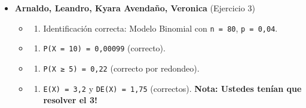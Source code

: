 \documentclass[
  spanish,
  letterpaper,
  DIV=11,
  numbers=noendperiod]{scrreprt}
\providecommand{\tightlist}{%
  \setlength{\itemsep}{0pt}\setlength{\parskip}{0pt}}
\begin{document}
\begin{itemize}
\tightlist
\item
  \textbf{Arnaldo, Leandro, Kyara Avendaño, Veronica} (Ejercicio 3)

  \begin{itemize}
  \tightlist
  \item
    \begin{enumerate}
    \def\labelenumi{\alph{enumi})}
    \tightlist
    \item
      Identificación correcta: Modelo Binomial con \texttt{n\ =\ 80},
      \texttt{p\ =\ 0,04}.
    \end{enumerate}
  \item
    \begin{enumerate}
    \def\labelenumi{\alph{enumi})}
    \setcounter{enumi}{1}
    \tightlist
    \item
      \texttt{P(X\ =\ 10)\ =\ 0,00099} (correcto).
    \end{enumerate}
  \item
    \begin{enumerate}
    \def\labelenumi{\alph{enumi})}
    \setcounter{enumi}{2}
    \tightlist
    \item
      \texttt{P(X\ ≥\ 5)\ =\ 0,22} (correcto por redondeo).
    \end{enumerate}
  \item
    \begin{enumerate}
    \def\labelenumi{\alph{enumi})}
    \setcounter{enumi}{3}
    \tightlist
    \item
      \texttt{E(X)\ =\ 3,2} y \texttt{DE(X)\ =\ 1,75} (correctos).
      \textbf{Nota: Ustedes tenían que resolver el 3!}
    \end{enumerate}
  \end{itemize}
\end{itemize}
\end{document}
